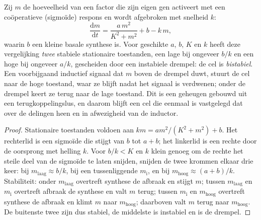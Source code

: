 \begin{theorem}\label{thm:b2:cell-differentiation:switch}
Zij $m$ de hoeveelheid van een factor die zijn eigen gen activeert met een
coöperatieve (sigmoïde) respons en wordt afgebroken met snelheid $k$:
\[
\frac{\mathrm{d}m}{\mathrm{d}t} = \frac{a\,m^{2}}{K^{2} + m^{2}} + b - k\,m,
\]
waarin $b$ een kleine basale synthese is. Voor geschikte $a$, $b$, $K$ en
$k$ heeft deze vergelijking \emph{twee} stabiele stationaire toestanden, een
lage bij ongeveer $b/k$ en een hoge bij ongeveer $a/k$, gescheiden door een
instabiele drempel: de cel is \emph{bistabiel}. Een voorbijgaand inductief
signaal dat $m$ boven de drempel duwt, stuurt de cel naar de hoge toestand,
waar ze blijft nadat het signaal is verdwenen; onder de drempel keert ze
terug naar de lage toestand. Dit is een geheugen gebouwd uit een
terugkoppelingslus, en daarom blijft een cel die eenmaal is vastgelegd dat
over de delingen heen en in afwezigheid van de inductor.
\end{theorem}
\begin{proof}
Stationaire toestanden voldoen aan $k m = a m^{2}/(K^{2} + m^{2}) + b$. Het
rechterlid is een sigmoïde die stijgt van $b$ tot $a + b$; het linkerlid is
een rechte door de oorsprong met helling $k$. Voor $b/k < K$ en $k$ klein
genoeg om de rechte het steile deel van de sigmoïde te laten snijden,
snijden de twee krommen elkaar drie keer: bij $m_{\text{laag}} \approx b/k$,
bij een tussenliggende $m_{\text{i}}$, en bij $m_{\text{hoog}} \approx (a +
b)/k$. Stabiliteit: onder $m_{\text{laag}}$ overtreft synthese de afbraak en
stijgt $m$; tussen $m_{\text{laag}}$ en $m_{\text{i}}$ overtreft afbraak de
synthese en valt $m$ terug; tussen $m_{\text{i}}$ en
$m_{\text{hoog}}$ overtreft synthese de afbraak en klimt $m$ naar
$m_{\text{hoog}}$; daarboven valt $m$ terug naar $m_{\text{hoog}}$.
De buitenste twee zijn dus stabiel, de middelste is instabiel en is de
drempel.
\end{proof}


